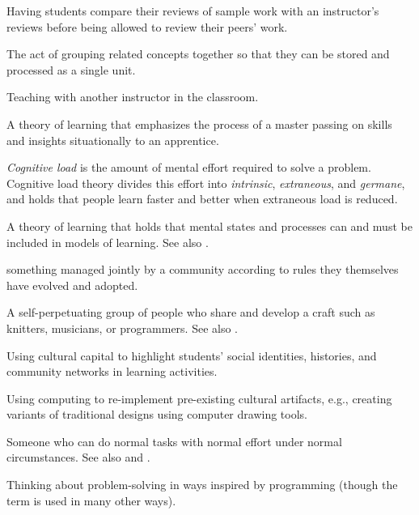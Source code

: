 \begin{description}
 Having students
compare their reviews of sample work with an instructor's reviews before being
allowed to review their peers' work.

 The act of grouping related concepts together so
that they can be stored and processed as a single unit.

 Teaching with another instructor in the
classroom.

 A theory of
learning that emphasizes the process of a master passing on skills and insights
situationally to an apprentice.

 \emph{Cognitive load} is
the amount of mental effort required to solve a problem.  Cognitive load theory
divides this effort into \emph{intrinsic}, \emph{extraneous}, and
\emph{germane}, and holds that people learn faster and better when extraneous
load is reduced.

 A theory of learning that holds that mental
states and processes can and must be included in models of learning. See also
.

 something managed jointly by a community according
to rules they themselves have evolved and adopted.

 A self-perpetuating
group of people who share and develop a craft such as knitters, musicians, or
programmers. See also
.

 Using cultural
capital to highlight students' social identities, histories, and community
networks in learning activities.

 Using computing
to re-implement pre-existing cultural artifacts, e.g., creating variants of
traditional designs using computer drawing tools.

 Someone who can do
normal tasks with normal effort under normal circumstances.  See also
 and .

 Thinking about
problem-solving in ways inspired by programming (though the term is used in many
other ways).


\end{description}

